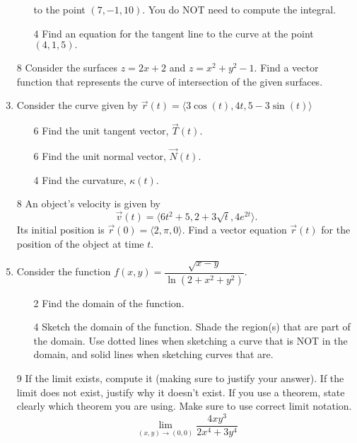 \documentclass[addpoints,12pt]{exam}
\begin{document}
\begin{enumerate}
\begin{itemize}
to the point $(7, -1, 10).$ You do NOT need to compute the integral.
\vfill
\item[4] Find an equation for the tangent line to the curve at the point $(4, 1, 5).$
\vfill
\end{itemize}
\newpage
\item[8] Consider the surfaces $ z = 2x+2$ and $ z = x^2+y^2-1.$ Find a vector function
that represents the curve of intersection of the given surfaces.
\newpage
\item Consider the curve given by $\vec{r}(t)=\langle 3\cos(t),4t,5-3\sin(t)\rangle$
\begin{itemize}
\item[6] Find the unit tangent vector, $\vec{T}(t).$
\vfill
\item[6] Find the unit normal vector, $\vec{N}(t).$
\vfill
\item[4] Find the curvature, $\kappa(t).$
\vfill
\end{itemize}
\newpage
\item[8] An object's velocity is given by
$$\vec{v}(t) = \langle 6t^2+5, 2+ 3\sqrt{t} , 4e^{2t} \rangle.$$
Its initial position is $\vec{r}(0) = \langle 2,\pi,0 \rangle.$ Find a vector equation $\vec{r}(t)$ for
the position of the object at time $t.$
\newpage
\item Consider the function $f(x,y) = \dfrac{\sqrt{x-y}}{ \ln(2+ x^2 +y^2)}.$
\begin{itemize}
\item[2] Find the domain of the function.
\vfill
\item[4] Sketch the domain of the function. Shade the region(s) that are part of the domain. Use
dotted lines when sketching a curve that is NOT in the domain, and solid lines when sketching
curves that are.
\vfill
\vfill
\end{itemize}
\newpage
\item[9] If the limit exists, compute it (making sure to justify your answer). If the limit does
not exist, justify why it doesn’t exist. If you use a theorem, state clearly which theorem you are
using. Make sure to use correct limit notation.
$$\displaystyle\lim_{(x,y) \to (0,0)} \dfrac{4xy^3}{2x^4 + 3y^4}$$
\vfill
\newpage
\end{enumerate}
\end{document}

